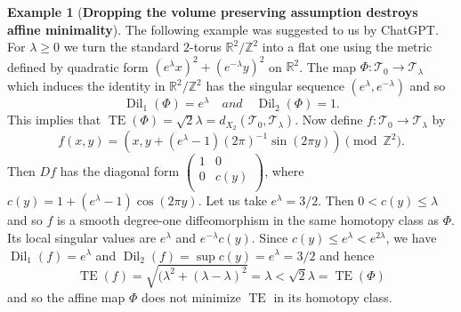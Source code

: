 \documentclass[11pt,letterpaper]{amsart}
\theoremstyle{definition}
\newtheorem{example}[theorem]{Example}
\numberwithin{equation}{section}
\theoremstyle{definition}
\newcommand{\Tc}{\mathcal{T}}
\newcommand{\Rb}{\mathbb{R}}
\newcommand{\Zb}{\mathbb{Z}}
\DeclareMathOperator{\TE}{TE}
\newcommand{\Dil}{\operatorname{Dil}}
\begin{document}
\begin{example}[{\bf Dropping the volume preserving assumption destroys affine minimality}]
\label{example:notmeasuerpres}The following example was suggested to us by ChatGPT.
For $\lambda\ge 0$ we turn the  standard $2$-torus $\Rb^2/\Zb^2$ into a flat one  using the metric defined by
quadratic form $(e^\lambda x)^2 + (e^{-\lambda}y)^2$ on $\Rb^2$. The map $\Phi: \Tc_0\to \Tc_\lambda$ which induces the identity 
in $\Rb^2/\Zb^2$ has  the singular sequence $(e^\lambda , e^{-\lambda})$ and so 
\[
\Dil_1(\Phi) = e^{\lambda}\quad and \quad   \Dil_2(\Phi) = 1.
\]
This implies that $\TE(\Phi) = \sqrt{2}\lambda = d_{X_2}(\Tc_0,\Tc_\lambda)$.
Now define $f: \Tc_0\to \Tc_\lambda$ by 
\[
f(x,y) = (x, y + (e^\lambda - 1)(2\pi)^{-1}\sin(2\pi y)) \pmod{\Zb^2}.
\]
Then $Df$ has the diagonal form $(\begin{smallmatrix} 1 & 0\\ 0 & c(y)\\ \end{smallmatrix})$, where $c(y) = 1 + (e^\lambda - 1)\cos(2\pi y)$.
Let us take  $e^\lambda = 3/2$. Then  $0 < c(y) \le \lambda$ and so $f$ is a
smooth degree-one diffeomorphism in the same homotopy class as $\Phi$. Its local
singular values are $e^\lambda$ and $e^{-\lambda}c(y)$. Since $c(y) \le  e^\lambda < e^{2\lambda}$,
we have $\Dil_1(f) = e^\lambda$ and $\Dil_2(f) = \sup c(y) =e^\lambda=3/2$ and hence 
\[
\TE(f) = \sqrt{(\lambda^2 + (\lambda - \lambda)^2} =\lambda < \sqrt{2}\lambda = \TE(\Phi)
\]
and so the affine map $\Phi$ does not minimize $\TE$ in its homotopy class. 
\end{example}
\end{document}
